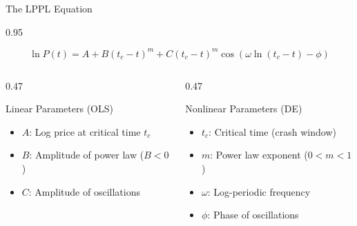 \documentclass[9pt, aspectratio=169, t]{beamer}
\begin{document}
\begin{frame}{The LPPL Equation}
    \begin{cminipage}{0.95\textwidth}
    {\footnotesize
    \begin{center}
        \begin{minipage}{0.85\textwidth}
            \begin{block}{}
                \large
                $$\boxed{\ln P(t) = A + B(t_c - t)^m + C(t_c - t)^m \cos(\omega \ln(t_c - t) - \phi)}$$
            \end{block}
        \end{minipage}
    \end{center}

    \vspace{0.2cm}
    \begin{columns}[T]
        \begin{column}{0.47\textwidth}
            \begin{exampleblock}{Linear Parameters (OLS)}
                \begin{itemize}\setlength{\itemsep}{0pt}
                    \item $A$: Log price at critical time $t_c$
                    \item $B$: Amplitude of power law ($B < 0$)
                    \item $C$: Amplitude of oscillations
                \end{itemize}
            \end{exampleblock}
        \end{column}
        \begin{column}{0.47\textwidth}
            \begin{alertblock}{Nonlinear Parameters (DE)}
                \begin{itemize}\setlength{\itemsep}{0pt}
                    \item $t_c$: Critical time (crash window)
                    \item $m$: Power law exponent ($0 < m < 1$)
                    \item $\omega$: Log-periodic frequency
                    \item $\phi$: Phase of oscillations
                \end{itemize}
            \end{alertblock}
        \end{column}
    \end{columns}
    }
    \end{cminipage}
\end{frame}
\end{document}
